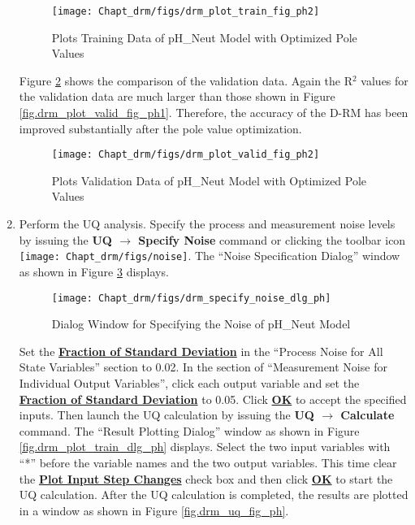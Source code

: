 \begin{enumerate}
	\begin{figure}[H]
		\begin{center}
			\texttt{[image: Chapt\_drm/figs/drm\_plot\_train\_fig\_ph2]}
			\caption{Plots Training Data of pH\_Neut Model with Optimized Pole Values}
			\label{fig.drm_plot_train_fig_ph2}
		\end{center}
	\end{figure}
	Figure \ref{fig.drm_plot_valid_fig_ph2} shows the comparison of the validation data.  Again the R$^2$ values for the validation data are much larger than those shown in 
	Figure \ref{fig.drm_plot_valid_fig_ph1}.  Therefore, the accuracy of the D-RM has been improved substantially after the pole value optimization.
	\begin{figure}[H]
		\begin{center}
			\texttt{[image: Chapt\_drm/figs/drm\_plot\_valid\_fig\_ph2]}
			\caption{Plots Validation Data of pH\_Neut Model with Optimized Pole Values}
			\label{fig.drm_plot_valid_fig_ph2}
		\end{center}
	\end{figure}
	\item Perform the UQ analysis. Specify the process and measurement noise levels by issuing the \textbf{UQ $\rightarrow$ Specify Noise} command or clicking the toolbar icon \texttt{[image: Chapt\_drm/figs/noise]}.  The ``Noise Specification Dialog'' window as shown in Figure \ref{fig.drm_specify_noise_dlg_ph} displays.
	\begin{figure}[H]
		\begin{center}
			\texttt{[image: Chapt\_drm/figs/drm\_specify\_noise\_dlg\_ph]}
			\caption{Dialog Window for Specifying the Noise of pH\_Neut Model}
			\label{fig.drm_specify_noise_dlg_ph}
		\end{center}
	\end{figure}
	Set the \textbf{\underline{Fraction of Standard Deviation}} in the ``Process Noise for All State Variables'' section to 0.02.  In the section of ``Measurement Noise for Individual Output Variables'', click each output variable and set the \textbf{\underline{Fraction of Standard Deviation}} to 0.05.  Click \textbf{\underline{OK}} to accept the specified inputs.  Then launch the UQ calculation by issuing the \textbf{UQ $\rightarrow$ Calculate} command.  The ``Result Plotting Dialog'' window as shown in Figure \ref{fig.drm_plot_train_dlg_ph} displays.  Select the two input variables with ``*'' before the variable names and the two output variables.  This time clear the \textbf{\underline{Plot Input Step Changes}} check box and then click \textbf{\underline{OK}} to start the UQ calculation.  After the UQ calculation is completed, the results are plotted in a window as shown in Figure \ref{fig.drm_uq_fig_ph}.

\end{enumerate}
